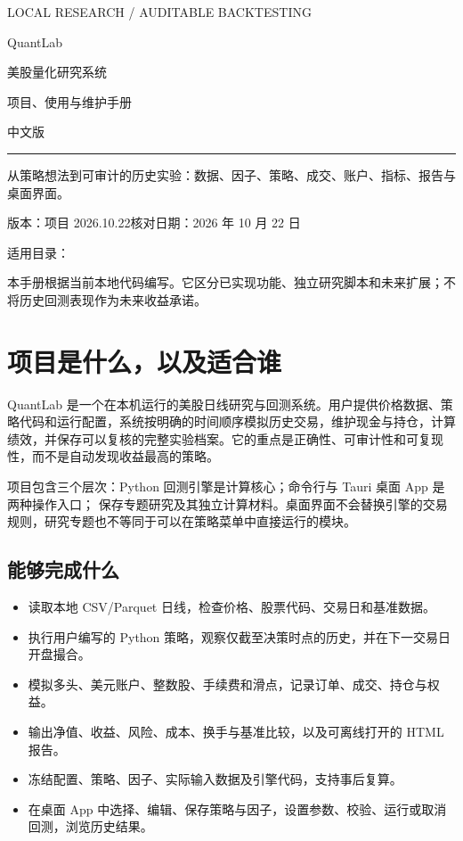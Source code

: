 \documentclass[UTF8,fontset=none,11pt]{ctexart}
\let\originalsection\section
\renewcommand{\section}{\Needspace{9\baselineskip}\originalsection}
\let\originalsubsection\subsection
\renewcommand{\subsection}{\Needspace{8\baselineskip}\originalsubsection}
\begin{document}
\begin{titlepage}
\color{ink}
{\sffamily\large LOCAL RESEARCH / AUDITABLE BACKTESTING\par}
\vspace{28mm}
{\sffamily\fontsize{42}{48}\selectfont QuantLab\par}
\vspace{8mm}
{\Huge 美股量化研究系统\par}
\vspace{5mm}
{\LARGE 项目、使用与维护手册\par}
\vspace{12mm}
{\large 中文版\par}
\vfill
\rule{\linewidth}{1pt}
\vspace{5mm}
从策略想法到可审计的历史实验：数据、因子、策略、成交、账户、指标、报告与桌面界面。

\vspace{8mm}
版本：项目 2026.10.22\quad 核对日期：2026 年 10 月 22 日

适用目录：

本手册根据当前本地代码编写。它区分已实现功能、独立研究脚本和未来扩展；不将历史回测表现作为未来收益承诺。
\end{titlepage}
\tableofcontents
\clearpage

\section{项目是什么，以及适合谁}
QuantLab 是一个在本机运行的美股日线研究与回测系统。用户提供价格数据、策略代码和运行配置，系统按明确的时间顺序模拟历史交易，维护现金与持仓，计算绩效，并保存可以复核的完整实验档案。它的重点是正确性、可审计性和可复现性，而不是自动发现收益最高的策略。

项目包含三个层次：Python 回测引擎是计算核心；命令行与 Tauri 桌面 App 是两种操作入口； 保存专题研究及其独立计算材料。桌面界面不会替换引擎的交易规则，研究专题也不等同于可以在策略菜单中直接运行的模块。

\subsection{能够完成什么}
\begin{itemize}
\item 读取本地 CSV/Parquet 日线，检查价格、股票代码、交易日和基准数据。
\item 执行用户编写的 Python 策略，观察仅截至决策时点的历史，并在下一交易日开盘撮合。
\item 模拟多头、美元账户、整数股、手续费和滑点，记录订单、成交、持仓与权益。
\item 输出净值、收益、风险、成本、换手与基准比较，以及可离线打开的 HTML 报告。
\item 冻结配置、策略、因子、实际输入数据及引擎代码，支持事后复算。
\item 在桌面 App 中选择、编辑、保存策略与因子，设置参数、校验、运行或取消回测，浏览历史结果。
\end{itemize}
\end{document}
